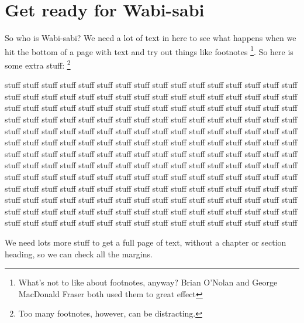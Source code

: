 \documentclass[dissertation]{bsu-cs}  %
\begin{document}
\section{Get ready for Wabi-sabi}\label{sec:getReady}

So who is Wabi-sabi? We need a lot of text in here to see what happens when we hit the bottom of
a page with text and try out things like footnotes
\footnote{What's not to like about footnotes, anyway?  Brian O'Nolan and George MacDonald Fraser both used them to great effect}.
So here is some extra stuff:%
\footnote{Too many footnotes, however, can be distracting.}

stuff stuff stuff stuff stuff stuff stuff stuff stuff stuff stuff stuff stuff
stuff stuff stuff stuff stuff stuff stuff stuff stuff stuff stuff stuff stuff
stuff stuff stuff stuff stuff stuff stuff stuff stuff stuff stuff stuff stuff
stuff stuff stuff stuff stuff stuff stuff stuff stuff stuff stuff stuff stuff
stuff stuff stuff stuff stuff stuff stuff stuff stuff stuff stuff stuff stuff
stuff stuff stuff stuff stuff stuff stuff stuff stuff stuff stuff stuff stuff
stuff stuff stuff stuff stuff stuff stuff stuff stuff stuff stuff stuff stuff
stuff stuff stuff stuff stuff stuff stuff stuff stuff stuff stuff stuff stuff
stuff stuff stuff stuff stuff stuff stuff stuff stuff stuff stuff stuff stuff
stuff stuff stuff stuff stuff stuff stuff stuff stuff stuff stuff stuff stuff
stuff stuff stuff stuff stuff stuff stuff stuff stuff stuff stuff stuff stuff
stuff stuff stuff stuff stuff stuff stuff stuff stuff stuff stuff stuff stuff
stuff stuff stuff stuff stuff stuff stuff stuff stuff stuff stuff stuff stuff
stuff stuff stuff stuff stuff stuff stuff stuff stuff stuff stuff stuff stuff
stuff stuff stuff stuff stuff stuff stuff stuff stuff stuff stuff stuff stuff
stuff stuff stuff stuff stuff stuff stuff stuff stuff stuff stuff stuff stuff

We need lots more stuff to get a full page of text, without a chapter or section heading,
so we can check all the margins.
\end{document}
